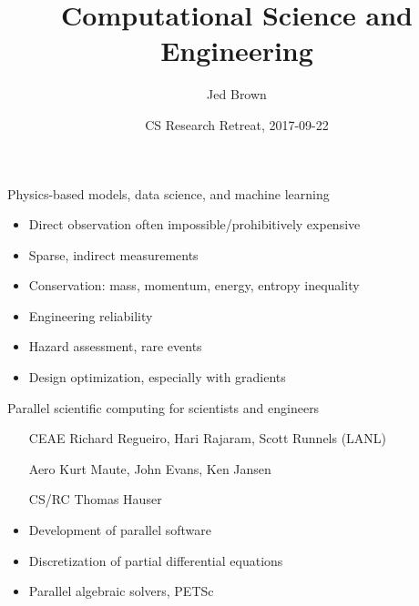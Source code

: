 \documentclass{beamer}
\title{Computational Science and Engineering}
\author{Jed Brown}
\date{CS Research Retreat, 2017-09-22}
\begin{document}
\lstset{language=C}
\normalem
{}



\begin{frame}{Physics-based models, data science, and machine learning}
  \begin{itemize}
  \item Direct observation often impossible/prohibitively expensive
  \item Sparse, indirect measurements
  \item Conservation: mass, momentum, energy, entropy inequality
  \item Engineering reliability
  \item Hazard assessment, rare events
  \item Design optimization, especially with gradients
  \end{itemize}
\end{frame}

% 

\begin{frame}{Parallel scientific computing for scientists and engineers}
  \begin{itemize}
  \item[CEAE] Richard Regueiro, Hari Rajaram, Scott Runnels (LANL)
  \item[Aero] Kurt Maute, John Evans, Ken Jansen
  \item[CS/RC] Thomas Hauser
  \item Development of parallel software
  \item Discretization of partial differential equations
  \item Parallel algebraic solvers, PETSc
  \end{itemize}
\end{frame}
\end{document}
